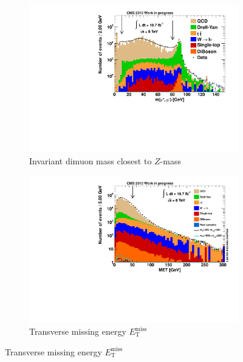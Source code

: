\begin{figure}[!htbp]
  \ContinuedFloat
  \centering
  \begin{subfigure}[b]{0.495\textwidth}
    \centering
    \includegraphics[width=\textwidth]{plots/nTL_zmass.pdf}
    \caption{Invariant dimuon mass closest to $Z$-mass \label{fig:ntlzmass}}
  \end{subfigure}
  \begin{subfigure}[b]{0.495\textwidth}
    \centering
    \includegraphics[width=\textwidth]{plots/nTL_met.pdf}
    \caption{Transverse missing energy $E_{\text{T}}^{\text{miss}}$ \label{fig:ntlmet}}
  \end{subfigure}
\end{figure}

